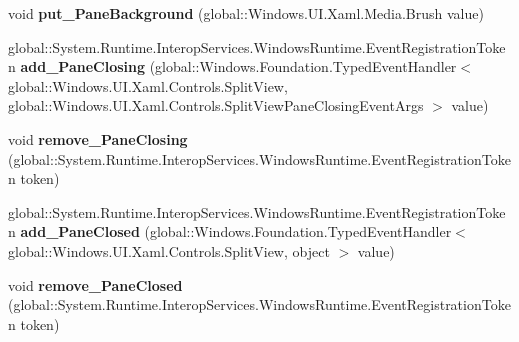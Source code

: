 \begin{DoxyCompactItemize}
\item 
\mbox{\label{interface_windows_1_1_u_i_1_1_xaml_1_1_controls_1_1_i_split_view_a097467d9287cc5b1864024d0d471fe18}} 
void {\bfseries put\+\_\+\+Pane\+Background} (global\+::\+Windows.\+U\+I.\+Xaml.\+Media.\+Brush value)
\item 
\mbox{\label{interface_windows_1_1_u_i_1_1_xaml_1_1_controls_1_1_i_split_view_a69ee46b94201df4d3b787eb9e974289a}} 
global\+::\+System.\+Runtime.\+Interop\+Services.\+Windows\+Runtime.\+Event\+Registration\+Token {\bfseries add\+\_\+\+Pane\+Closing} (global\+::\+Windows.\+Foundation.\+Typed\+Event\+Handler$<$ global\+::\+Windows.\+U\+I.\+Xaml.\+Controls.\+Split\+View, global\+::\+Windows.\+U\+I.\+Xaml.\+Controls.\+Split\+View\+Pane\+Closing\+Event\+Args $>$ value)
\item 
\mbox{\label{interface_windows_1_1_u_i_1_1_xaml_1_1_controls_1_1_i_split_view_a6264ad76174d999d605b9e7745a813f6}} 
void {\bfseries remove\+\_\+\+Pane\+Closing} (global\+::\+System.\+Runtime.\+Interop\+Services.\+Windows\+Runtime.\+Event\+Registration\+Token token)
\item 
\mbox{\label{interface_windows_1_1_u_i_1_1_xaml_1_1_controls_1_1_i_split_view_a5a3d86d9589e5de24342d96eaf2c1c61}} 
global\+::\+System.\+Runtime.\+Interop\+Services.\+Windows\+Runtime.\+Event\+Registration\+Token {\bfseries add\+\_\+\+Pane\+Closed} (global\+::\+Windows.\+Foundation.\+Typed\+Event\+Handler$<$ global\+::\+Windows.\+U\+I.\+Xaml.\+Controls.\+Split\+View, object $>$ value)
\item 
\mbox{\label{interface_windows_1_1_u_i_1_1_xaml_1_1_controls_1_1_i_split_view_a6450b9b0d59bee0c4df61f67cba5609e}} 
void {\bfseries remove\+\_\+\+Pane\+Closed} (global\+::\+System.\+Runtime.\+Interop\+Services.\+Windows\+Runtime.\+Event\+Registration\+Token token)
\item 
\mbox{\label{interface_windows_1_1_u_i_1_1_xaml_1_1_controls_1_1_i_split_view_ab894c1ae83bd61f588e1be844b3d9a6f}} 

\end{DoxyCompactItemize}
